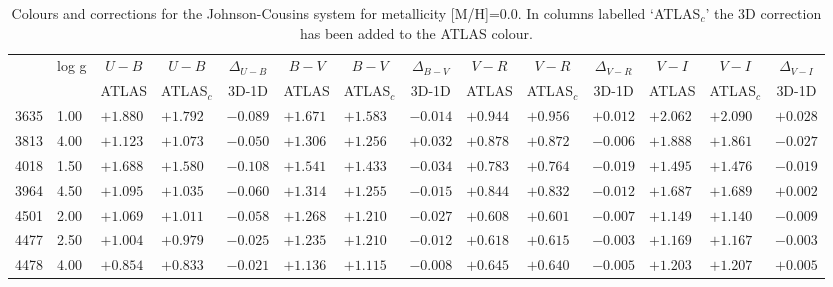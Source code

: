 \documentclass[]{aa}
\def\teff{$T\rm_{eff}$}
\begin{document}
\begin{appendix}
\begin{table*}
\caption{\label{ubvrim00}
Colours and corrections for the Johnson-Cousins system for metallicity [M/H]=0.0. In columns labelled  `ATLAS$_c$' the 3D correction
has been added to the ATLAS colour. }
\renewcommand{\tabcolsep}{3pt}
\tabskip=0pt
\begin{center}
\begin{tabular}{llllllllllllll}
\hline\noalign{\smallskip}
\multicolumn{1}{c}{\teff} & 
\multicolumn{1}{c}{log g} & 
\multicolumn{1}{c}{$U-B$} &
\multicolumn{1}{c}{$U-B$} &
\multicolumn{1}{c}{$\Delta_{U-B}$} &
\multicolumn{1}{c}{$B-V$} &
\multicolumn{1}{c}{$B-V$} &
\multicolumn{1}{c}{$\Delta_{B-V}$} &
\multicolumn{1}{c}{$V-R$} &
\multicolumn{1}{c}{$V-R$} &
\multicolumn{1}{c}{$\Delta_{V-R}$} &
\multicolumn{1}{c}{$V-I$} &
\multicolumn{1}{c}{$V-I$} &
\multicolumn{1}{c}{$\Delta_{V-I}$} \\
\multicolumn{2}{c}{ } &  
\multicolumn{1}{c}{ATLAS} &
\multicolumn{1}{c}{ATLAS$_c$}&
\multicolumn{1}{c}{3D-1D}&
\multicolumn{1}{c}{ATLAS} &
\multicolumn{1}{c}{ATLAS$_c$}&
\multicolumn{1}{c}{3D-1D}&
\multicolumn{1}{c}{ATLAS} &
\multicolumn{1}{c}{ATLAS$_c$}&
\multicolumn{1}{c}{3D-1D}&
\multicolumn{1}{c}{ATLAS} &
\multicolumn{1}{c}{ATLAS$_c$}&
\multicolumn{1}{c}{3D-1D} \\
\hline\noalign{\smallskip}
\hline\noalign{\smallskip}
3635  &1.00 & $+1.880$ & $+1.792$ &$ -0.089$ &$ +1.671$ &$ +1.583$ &$ -0.014$ &$ +0.944$ &$ +0.956$ &$ +0.012$ &$ +2.062$&$ +2.090$&$  +0.028$ \\
3813  &4.00 & $+1.123$ & $+1.073$ &$ -0.050$ &$ +1.306$ &$ +1.256$ &$ +0.032$ &$ +0.878$ &$ +0.872$ &$ -0.006$ &$ +1.888$&$ +1.861$&$  -0.027$ \\
4018  &1.50 & $+1.688$ & $+1.580$ &$ -0.108$ &$ +1.541$ &$ +1.433$ &$ -0.034$ &$ +0.783$ &$ +0.764$ &$ -0.019$ &$ +1.495$&$ +1.476$&$  -0.019$ \\
3964  &4.50 & $+1.095$ & $+1.035$ &$ -0.060$ &$ +1.314$ &$ +1.255$ &$ -0.015$ &$ +0.844$ &$ +0.832$ &$ -0.012$ &$ +1.687$&$ +1.689$&$  +0.002$ \\
4501  &2.00 & $+1.069$ & $+1.011$ &$ -0.058$ &$ +1.268$ &$ +1.210$ &$ -0.027$ &$ +0.608$ &$ +0.601$ &$ -0.007$ &$ +1.149$&$ +1.140$&$  -0.009$ \\
4477  &2.50 & $+1.004$ & $+0.979$ &$ -0.025$ &$ +1.235$ &$ +1.210$ &$ -0.012$ &$ +0.618$ &$ +0.615$ &$ -0.003$ &$ +1.169$&$ +1.167$&$  -0.003$ \\
4478  &4.00 & $+0.854$ & $+0.833$ &$ -0.021$ &$ +1.136$ &$ +1.115$ &$ -0.008$ &$ +0.645$ &$ +0.640$ &$ -0.005$ &$ +1.203$&$ +1.207$&$  +0.005$ \\

\end{tabular}
\end{center}
\end{table*}
\end{appendix}
\end{document}
